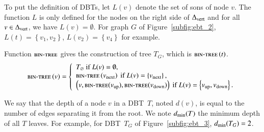 \documentclass[preprint]{elsarticle}
\newcommand{\set}[1]{\left\{ #1 \right\}}
\newcommand{\deltavert}{\Delta_{\mbox{\scriptsize{vert}}}}
\newcommand{\bintree}{\textsc{bin-tree}}
\newcommand{\ebt}{DBT}
\newcommand{\dfs}{L}
\newcommand{\dmin}{d_{\mbox{\scriptsize{min}}}}
\begin{document}
To put the definition of \ebt s, let $\dfs\left(v\right)$ denote the set of sons of node $v$. The function $\dfs$ is only defined for the nodes on the right side of $\deltavert$ and for all $v \in \deltavert$, we have $L\left(v\right) = \emptyset$. For graph $G$ of Figure~\ref{subfig:ebt_2}, $\dfs\left(t\right) = \set{v_1,v_2}$, $\dfs\left(v_2\right) = \set{v_4}$ for example. 

Function $\bintree$ gives the construction of tree $T_G$, which is $\bintree \left(t\right)$.
\[
\bintree\left(v\right) = 
\left\{
\begin{array}{l}
T_\varnothing ~\mbox{if}~ \dfs(v) = \emptyset,\\
\bintree\left(v_{\mbox{\scriptsize{next}}}\right)  ~\mbox{if}~ \dfs(v) = \set{v_{\mbox{\scriptsize{next}}}},\\
\left(v, \bintree(v_{\mbox{\scriptsize{up}}}), \bintree( v_{\mbox{\scriptsize{down}}})\right) ~\mbox{if}~ \dfs(v) = \set{v_{\mbox{\scriptsize{up}}},v_{\mbox{\scriptsize{down}}}}.
\end{array}
\right.
\]


We say that the depth of a node $v$ in a \ebt ~$T$, noted $d(v)$, is equal to the number of edges separating it from the root.
We note $\dmin(T)$ the minimum depth of all $T$ leaves. For example, for \ebt ~$T_G$ of Figure~\ref{subfig:ebt_3}, $\dmin(T_G) = 2$. 
\end{document}
